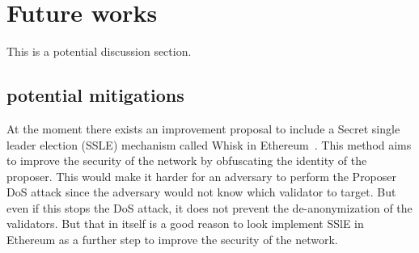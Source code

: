 

\section{Future works}\label{sec:future-works}
This is a potential discussion section.

\subsection{potential mitigations}\label{subsec:potential-mitigations}
At the moment there exists an improvement proposal to include a Secret single leader election (SSLE) mechanism called Whisk in Ethereum~\cite{EthereumResearchSSLE2024}.
This method aims to improve the security of the network by obfuscating the identity of the proposer.
This would make it harder for an adversary to perform the Proposer DoS attack since the adversary would not know which validator to target.
But even if this stops the DoS attack, it does not prevent the de-anonymization of the validators.
But that in itself is a good reason to look implement SSlE in Ethereum as a further step to improve the security of the network.
